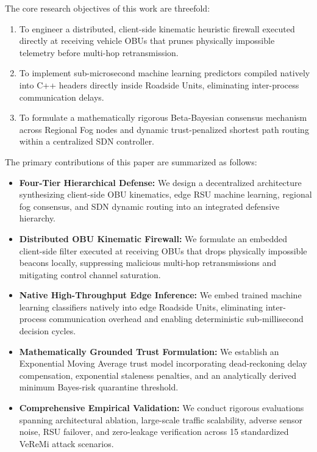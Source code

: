 \documentclass[conference]{IEEEtran}
\begin{document}
The core research objectives of this work are threefold:
\begin{enumerate}
    \item To engineer a distributed, client-side kinematic heuristic firewall executed directly at receiving vehicle OBUs that prunes physically impossible telemetry before multi-hop retransmission.
    \item To implement sub-microsecond machine learning predictors compiled natively into C++ headers directly inside Roadside Units, eliminating inter-process communication delays.
    \item To formulate a mathematically rigorous Beta-Bayesian consensus mechanism across Regional Fog nodes and dynamic trust-penalized shortest path routing within a centralized SDN controller.
\end{enumerate}

The primary contributions of this paper are summarized as follows:
\begin{itemize}
    \item \textbf{Four-Tier Hierarchical Defense:} We design a decentralized architecture synthesizing client-side OBU kinematics, edge RSU machine learning, regional fog consensus, and SDN dynamic routing into an integrated defensive hierarchy.
    \item \textbf{Distributed OBU Kinematic Firewall:} We formulate an embedded client-side filter executed at receiving OBUs that drops physically impossible beacons locally, suppressing malicious multi-hop retransmissions and mitigating control channel saturation.
    \item \textbf{Native High-Throughput Edge Inference:} We embed trained machine learning classifiers natively into edge Roadside Units, eliminating inter-process communication overhead and enabling deterministic sub-millisecond decision cycles.
    \item \textbf{Mathematically Grounded Trust Formulation:} We establish an Exponential Moving Average trust model incorporating dead-reckoning delay compensation, exponential staleness penalties, and an analytically derived minimum Bayes-risk quarantine threshold.
    \item \textbf{Comprehensive Empirical Validation:} We conduct rigorous evaluations spanning architectural ablation, large-scale traffic scalability, adverse sensor noise, RSU failover, and zero-leakage verification across 15 standardized VeReMi attack scenarios.
\end{itemize}
\end{document}
